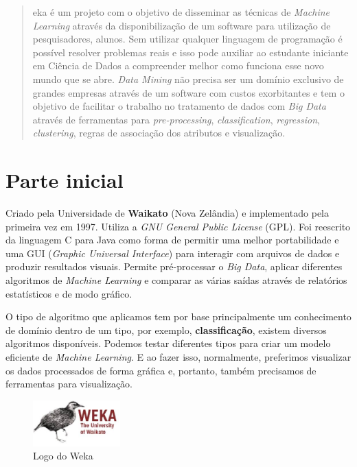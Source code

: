 \documentclass[a4paper,11pt]{article}
\begin{document}
	
	\maketitle %
	\thispagestyle{fancy} %
	
\begin{abstract}
	eka é um projeto com o objetivo de disseminar as técnicas de \textit{Machine Learning} através da disponibilização de um software para utilização de pesquisadores, alunos. Sem utilizar qualquer linguagem de programação é possível resolver problemas reais e isso pode auxiliar ao estudante iniciante em Ciência de Dados a compreender melhor como funciona esse novo mundo que se abre. \textit{Data Mining} não precisa ser um domínio exclusivo de grandes empresas através de um software com  custos exorbitantes e tem o objetivo de facilitar o trabalho no tratamento de dados com \textit{Big Data} através de ferramentas para \textit{pre-processing}, \textit{classification}, \textit{regression}, \textit{clustering}, regras de associação dos atributos e visualização.
\end{abstract}

\section{Parte inicial}
Criado pela Universidade de \textbf{Waikato} (Nova Zelândia) e implementado pela primeira vez em 1997. Utiliza a \textit{GNU General Public License} (GPL). Foi reescrito da linguagem C para Java como forma de permitir uma melhor portabilidade e uma GUI (\textit{Graphic Universal Interface}) para interagir com arquivos de dados e produzir resultados visuais. Permite pré-processar o \textit{Big Data}, aplicar diferentes algoritmos de \textit{Machine Learning} e comparar as várias saídas através de relatórios estatísticos e de modo gráfico.

O tipo de algoritmo que aplicamos tem por base principalmente um conhecimento de domínio dentro de um tipo, por exemplo, \textbf{classificação}, existem diversos algoritmos disponíveis. Podemos testar diferentes tipos para criar um modelo eficiente de \textit{Machine Learning}. E ao fazer isso, normalmente, preferimos visualizar os dados processados de forma gráfica e, portanto, também precisamos de ferramentas para visualização.
\begin{figure}[H]
	\centering
	\includegraphics[width=0.3\textwidth]{imagem/logo.jpeg}
	\caption{Logo do Weka}
\end{figure}
\end{document}
